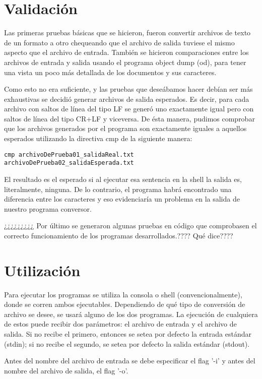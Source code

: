 \documentclass[a4paper,11pt]{article}
\begin{document}
\section{Validación}
Las primeras pruebas básicas que se hicieron, fueron convertir archivos de texto de un formato a otro chequeando que el archivo de salida tuviese el mismo aspecto que el archivo de entrada. También se hicieron comparaciones entre los archivos de entrada y salida usando el programa object dump (od), para tener una vista un poco más detallada de los documentos y sus caracteres.

\indent Como esto no era suficiente, y las pruebas que deseábamos hacer debían ser más exhaustivas se decidió generar archivos de salida esperados. Es decir, para cada archivo con saltos de línea del tipo LF se generó uno exactamente igual pero con saltos de línea del tipo CR+LF y viceversa. De ésta manera, pudimos comprobar que los archivos generados por el programa son exactamente iguales a aquellos esperados utilizando la directiva cmp de la siguiente manera:

\begin{verbatim}
cmp archivoDePrueba01_salidaReal.txt archivoDePrueba02_salidaEsperada.txt
\end{verbatim}

\indent El resultado es el esperado si al ejecutar esa sentencia en la shell la salida es, literalmente, ninguna. De lo contrario, el programa habrá encontrado una diferencia entre los caracteres y eso evidenciaría un problema en la salida de nuestro programa conversor.

¿¿¿¿¿¿¿¿¿ Por último se generaron algunas pruebas en código que comprobasen el correcto funcionamiento de los programas desarrollados.???? Qué dice????


\section{Utilización}
Para ejecutar los programas se utiliza la consola o shell (convencionalmente), donde se corren ambos ejecutables. Dependiendo de qué tipo de conversión de archivo se desee, se usará alguno de los dos programas. La ejecución de cualquiera de estos puede recibir dos parámetros: el archivo de entrada y el archivo de salida. Si no recibe el primero, entonces se setea por defecto la entrada estándar (stdin); si no recibe el segundo, se setea por defecto la salida estándar (stdout).

\indent	
Antes del nombre del archivo de entrada se debe especificar el flag '-i' y antes del nombre del archivo de salida, el flag '-o'.
\end{document}
